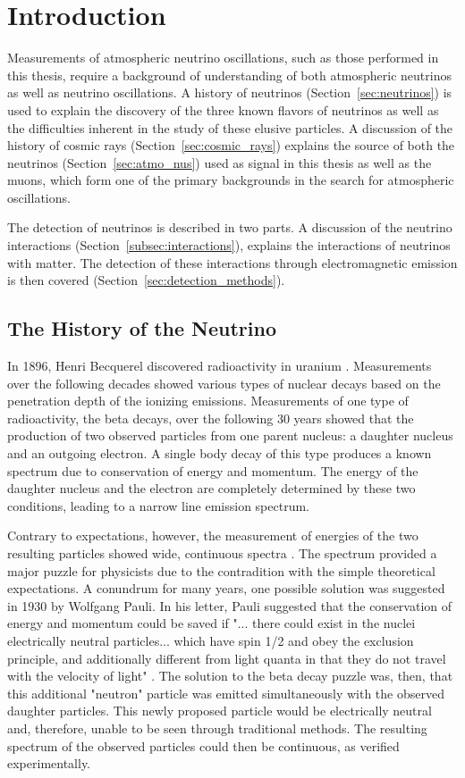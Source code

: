 \graphicspath{{chapters/introduction/images/}}
\chapter{Introduction}
Measurements of atmospheric neutrino oscillations, such as those performed in this thesis, require a background of understanding of both atmospheric neutrinos as well as neutrino oscillations. 
A history of neutrinos (Section~\ref{sec:neutrinos}) is used to explain the discovery of the three known flavors of neutrinos as well as the difficulties inherent in the study of these elusive particles.
A discussion of the history of cosmic rays (Section~\ref{sec:cosmic_rays}) explains the source of both the neutrinos (Section~\ref{sec:atmo_nus}) used as signal in this thesis as well as the muons, which form one of the primary backgrounds in the search for atmospheric oscillations.

The detection of neutrinos is described in two parts.
A discussion of the neutrino interactions (Section~\ref{subsec:interactions}), explains the interactions of neutrinos with matter.
The detection of these interactions through electromagnetic emission is then covered (Section~\ref{sec:detection_methods}).

\label{sec:neutrinos}
\section{The History of the Neutrino}
In 1896, Henri Becquerel discovered radioactivity in uranium \cite{Becquerel}.
Measurements over the following decades showed various types of nuclear decays based on the penetration depth of the ionizing emissions.
Measurements of one type of radioactivity, the beta decays, over the following 30 years showed that the production of two observed particles from one parent nucleus: a daughter nucleus and an outgoing electron.
A single body decay of this type produces a known spectrum due to conservation of energy and momentum.
The energy of the daughter nucleus and the electron are completely determined by these two conditions, leading to a narrow line emission spectrum.

Contrary to expectations, however, the measurement of energies of the two resulting particles showed wide, continuous spectra \cite{Chadwick}. 
The spectrum provided a major puzzle for physicists due to the contradition with the simple theoretical expectations.
A conundrum for many years, one possible solution was suggested in 1930 by Wolfgang Pauli.
In his letter, Pauli suggested that the conservation of energy and momentum could be saved if "... there could exist in the nuclei electrically neutral particles... which have spin 1/2 and obey the exclusion principle, and additionally different from light quanta in that they do not travel with the velocity of light" \cite{Pauli-Nu}.
The solution to the beta decay puzzle was, then, that this additional "neutron" particle was emitted simultaneously with the observed daughter particles.
This newly proposed particle would be electrically neutral and, therefore, unable to be seen through traditional methods.
The resulting spectrum of the observed particles could then be continuous, as verified experimentally.

